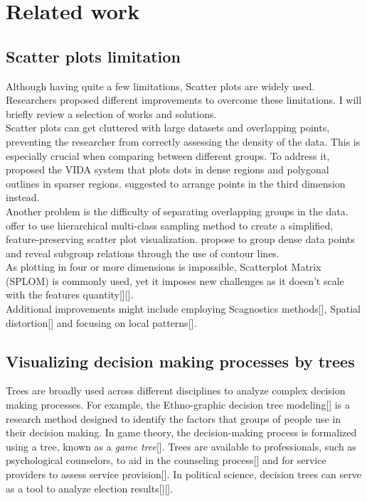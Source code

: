 \documentclass[11pt]{article}
\begin{document}
\section{Related work}\label{Related work}
\subsection{Scatter plots limitation}\label{Scatter plots limitation}
Although having quite a few limitations, Scatter plots are widely used. Researchers proposed different improvements to overcome these limitations. I will briefly review a selection of works and solutions.\\
Scatter plots can get cluttered with large datasets and overlapping points, preventing the researcher from correctly assessing the density of the data. This is especially crucial when comparing between different groups. To address it, \cite{woodruff1998constant} proposed the VIDA system that plots dots in dense regions and polygonal outlines in sparser regions. \cite{dang2010stacking} suggested to arrange points in the third dimension instead.\\
Another problem is the difficulty of separating overlapping groups in the data. \cite{lee2012ieee} offer to use hierarchical multi-class sampling method to create a simplified, feature-preserving scatter plot visualization. \cite{mayorga2013splatterplots} propose to group dense data points and reveal subgroup relations through the use of contour lines.\\
As plotting in four or more dimensions is impossible, Scatterplot Matrix (SPLOM) is commonly used, yet it imposes new challenges as it doesn’t scale with the features quantity[][].\\
Additional improvements might include employing Scagnostics methods[], Spatial distortion[] and focusing on local patterns[].
\subsection{Visualizing decision making processes by trees
}\label{Visualizing decision making processes by trees}
Trees are broadly used across different disciplines to analyze complex decision making processes. For example, the Ethno-graphic decision tree modeling[] is a research method designed to identify the factors that groups of people use in their decision making. In game theory, the decision-making process is formalized using a tree, known as a \textit{game tree}[]. Trees are available to professionals, such as psychological counselors, to aid in the counseling process[] and for service providers to assess service provision[]. In political science, decision trees can serve as a tool to analyze election results[][].
\end{document}
